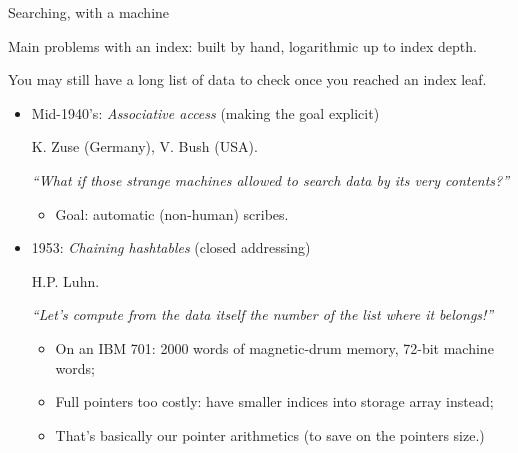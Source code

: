 \begin{frame}[fragile]{Searching, with a machine}

  Main problems with an index: built by hand, logarithmic up to index depth.  

  You may still have a long list of data to check once you reached an index leaf.

  \begin{itemize}
  \item Mid-1940's: {\em Associative access} (making the goal explicit)

    K. Zuse (Germany), V. Bush (USA).
    
    {\em ``What if those strange machines allowed to {\em search data by its very contents}?''}

    \begin{itemize}
    \item Goal: automatic (non-human) scribes.
    \end{itemize}
  \item 1953: {\em Chaining hashtables} (closed addressing)

    H.P. Luhn.

    {\em ``Let's {\em compute from the data itself} the number of the list where it belongs!''}

    \begin{itemize}
    \item On an IBM 701: 2000 words of magnetic-drum memory, 72-bit machine words;
    \item Full pointers too costly: have smaller indices into storage array instead;
    \item That's basically our pointer arithmetics (to save on the pointers size.)
    \end{itemize}
  \end{itemize}

\end{frame}


